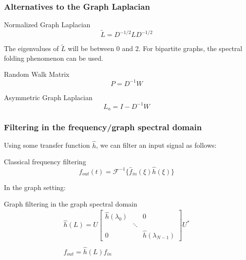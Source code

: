 \documentclass{beamer}
\begin{document}
\begin{frame}
  \frametitle{Alternatives to the Graph Laplacian}

  \begin{block}{Normalized Graph Laplacian}
    \begin{equation}
      \tilde{L} = D^{-1/2} L D^{-1/2}
    \end{equation}
  \end{block}

  The eigenvalues of $\tilde{L}$ will be between 0 and 2. For bipartite graphs,
  the spectral folding phenomenon can be used.

  \begin{block}{Random Walk Matrix}
    \begin{equation}
      P = D^{-1} W
    \end{equation}
  \end{block}

  \begin{block}{Asymmetric Graph Laplacian}
    \begin{equation}
      L_a = I - D^{-1} W
    \end{equation}
  \end{block}
  
\end{frame}

\begin{frame}
  \frametitle{Filtering in the frequency/graph spectral domain}

  Using some transfer function $\hat{h}$, we can filter an input signal as follows:
  \begin{block}{Classical frequency filtering}
    \begin{equation}
      f_{out}(t) = \mathcal{F}^{-1} \{ \hat{f}_{in}(\xi) \hat{h}(\xi)\}
    \end{equation}
  \end{block}

  In the graph setting:
  
  \begin{block}{Graph filtering in the graph spectral domain}
    \begin{equation}
      \begin{split}
        \hat{h}(L) = U
        \begin{bmatrix}
          \hat{h}(\lambda_0) & & 0 \\
           & \ddots & \\
          0 & & \hat{h}(\lambda_{N-1})
        \end{bmatrix}
        U^*
      \\\\
      f_{out} = \hat{h}(L) f_{in}
      \end{split}
    \end{equation}
  \end{block}
  
\end{frame}
\end{document}
